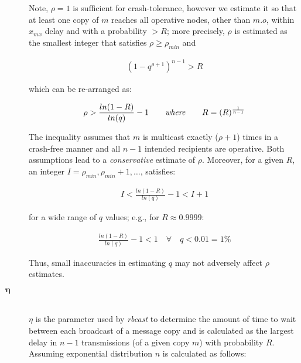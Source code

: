 \begin{description}
	    Note, $\rho = 1$ is sufficient for crash-tolerance, however we estimate it so that at least one copy of $m$ reaches all operative nodes, other than $m.o$, within $x_{mx}$ delay and with a probability $> R$; more precisely, $\rho$ is estimated as the smallest integer that satisfies $\rho \geq \rho_{min}$ and

		\begin{equation*}
		    \begin{aligned}
		        (1-q^{\rho+1})^{n-1} > R
		    \end{aligned}
		\end{equation*}

        which can be re-arranged as:

        \begin{equation*}
		    \begin{aligned}
		        \rho > \frac{ln(1-R)}{ln(q)} -1 \qquad \mbox{\emph{where}} \qquad R=(R)^{\frac{1}{n-1}}
		    \end{aligned}
		\end{equation*}

        The inequality assumes that $m$ is multicast exactly ($\rho +1$) times in a crash-free manner and all $n-1$  intended recipients are operative. Both assumptions lead to a \emph{conservative} estimate of $\rho$. Moreover, for a given $R$, an integer $I =\rho_{min}, \rho_{min} + 1, \ldots$, satisfies: 

        \begin{equation*}
		    \begin{aligned}
		        I < \frac{ln(1-R)}{ln(q)}-1 < I+1
		    \end{aligned}
		\end{equation*}
		
        for a wide range of $q$ values; e.g., for $R \approx 0.9999$:

        \begin{equation*}
		    \begin{aligned}
                \frac{ln(1-R)}{ln(q)}-1 < 1 \quad \forall \quad q < 0.01 = 1\%
		    \end{aligned}
		\end{equation*}

        Thus, small inaccuracies in estimating $q$ may not adversely affect $\rho$ estimates.  

        \item[\Huge$\boldsymbol{\eta}$] \hfill \\
        $\eta$ is the parameter used by \emph{rbcast} to determine the amount of time to wait between each broadcast of a message copy and is calculated as the largest delay in $n - 1$ transmissions (of a given copy $m$) with probability $R$.  Assuming exponential distribution $n$ is calculated as follows:
        

\end{description}
